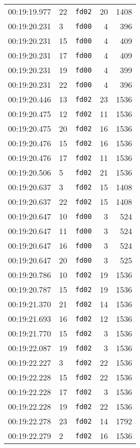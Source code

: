 \documentclass{article}
\begin{document}
\begin{longtable}{lllrr}
00:19:19.977 & 22 & \texttt{fd02} & 20 & 1408 \\
00:19:20.231 & 3 & \texttt{fd00} & 4 & 396 \\
00:19:20.231 & 15 & \texttt{fd00} & 4 & 409 \\
00:19:20.231 & 17 & \texttt{fd00} & 4 & 409 \\
00:19:20.231 & 19 & \texttt{fd00} & 4 & 399 \\
00:19:20.231 & 22 & \texttt{fd00} & 4 & 396 \\
00:19:20.446 & 13 & \texttt{fd02} & 23 & 1536 \\
00:19:20.475 & 12 & \texttt{fd02} & 11 & 1536 \\
00:19:20.475 & 20 & \texttt{fd02} & 16 & 1536 \\
00:19:20.476 & 15 & \texttt{fd02} & 16 & 1536 \\
00:19:20.476 & 17 & \texttt{fd02} & 11 & 1536 \\
00:19:20.506 & 5 & \texttt{fd02} & 21 & 1536 \\
00:19:20.637 & 3 & \texttt{fd02} & 15 & 1408 \\
00:19:20.637 & 22 & \texttt{fd02} & 15 & 1408 \\
00:19:20.647 & 10 & \texttt{fd00} & 3 & 524 \\
00:19:20.647 & 11 & \texttt{fd00} & 3 & 524 \\
00:19:20.647 & 16 & \texttt{fd00} & 3 & 524 \\
00:19:20.647 & 20 & \texttt{fd00} & 3 & 525 \\
00:19:20.786 & 10 & \texttt{fd02} & 19 & 1536 \\
00:19:20.787 & 15 & \texttt{fd02} & 19 & 1536 \\
00:19:21.370 & 21 & \texttt{fd02} & 14 & 1536 \\
00:19:21.693 & 16 & \texttt{fd02} & 12 & 1536 \\
00:19:21.770 & 15 & \texttt{fd02} & 3 & 1536 \\
00:19:22.087 & 19 & \texttt{fd02} & 3 & 1536 \\
00:19:22.227 & 3 & \texttt{fd02} & 22 & 1536 \\
00:19:22.228 & 15 & \texttt{fd02} & 22 & 1536 \\
00:19:22.228 & 17 & \texttt{fd02} & 3 & 1536 \\
00:19:22.228 & 19 & \texttt{fd02} & 22 & 1536 \\
00:19:22.278 & 23 & \texttt{fd02} & 14 & 1792 \\
00:19:22.279 & 2 & \texttt{fd02} & 16 & 1536 \\

\end{longtable}
\end{document}
